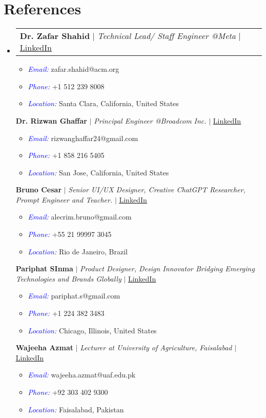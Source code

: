 \documentclass[letterpaper,11pt]{article}
\makeatletter
\newcommand{\resumeItem}[1]{
  \item\small{
    {#1 \vspace{-2pt}}
  }
}
\newcommand{\resumeProjectHeading}[2]{
    \item
    \begin{tabular*}{0.97\textwidth}{l@{\extracolsep{\fill}}r}
      \small#1 & #2 \\
    \end{tabular*}\vspace{-7pt}
}
\newcommand{\resumeSubHeadingListStart}{\begin{itemize}[leftmargin=0.15in, label={}]}
\newcommand{\resumeSubHeadingListEnd}{\end{itemize}}
\newcommand{\resumeItemListStart}{\begin{itemize}}
\newcommand{\resumeItemListEnd}{\end{itemize}\vspace{-5pt}}
\makeatother
\begin{document}
\section{\textbf{References}}
\resumeSubHeadingListStart
\resumeProjectHeading
{\textbf{{Dr. Zafar Shahid}} $|$ \emph{Technical Lead/ Staff Engineer @Meta} $|$ {\href{https://www.linkedin.com/in/zafarshahid/}{\underline{LinkedIn}}}}{}
\resumeItemListStart
\resumeItem{\textcolor{blue}{\itshape Email:} zafar.shahid@acm.org}
\resumeItem{\textcolor{blue}{\itshape Phone:} +1 512 239 8008}
\resumeItem{\textcolor{blue}{\itshape Location:} Santa Clara, California, United States}
\resumeItemListEnd
{\textbf{{Dr. Rizwan Ghaffar}} $|$ \emph{Principal Engineer @Broadcom Inc.} $|$ {\href{https://www.linkedin.com/in/rizwan-ghaffar-8283231a/}{\underline{LinkedIn}}}}{}
\resumeItemListStart
\resumeItem{\textcolor{blue}{\itshape Email:} rizwanghaffar24@gmail.com}
\resumeItem{\textcolor{blue}{\itshape Phone:} +1 858 216 5405}
\resumeItem{\textcolor{blue}{\itshape Location:} San Jose, California, United States}
\resumeItemListEnd
{\textbf{{Bruno Cesar}} $|$ \emph{Senior UI/UX Designer, Creative ChatGPT Researcher, Prompt Engineer and Teacher.} $|$ {\href{https://www.linkedin.com/in/brunoalecrim/}{\underline{LinkedIn}}}}{}
\resumeItemListStart
\resumeItem{\textcolor{blue}{\itshape Email:} alecrim.bruno@gmail.com}
\resumeItem{\textcolor{blue}{\itshape Phone:} +55 21 99997 3045}
\resumeItem{\textcolor{blue}{\itshape Location:} Rio de Janeiro, Brazil}
\resumeItemListEnd
{\textbf{{Pariphat SInma}} $|$ \emph{Product Designer, Design Innovator Bridging Emerging Technologies and Brands Globally} $|$ {\href{https://www.linkedin.com/in/pariphat-sinma/}{\underline{LinkedIn}}}}{}
\resumeItemListStart
\resumeItem{\textcolor{blue}{\itshape Email:} pariphat.s@gmail.com}
\resumeItem{\textcolor{blue}{\itshape Phone:} +1 224 382 3483}
\resumeItem{\textcolor{blue}{\itshape Location:} Chicago, Illinois, United States}
\resumeItemListEnd
{\textbf{{Wajeeha Azmat}} $|$ \emph{Lecturer at University of Agriculture, Faisalabad} $|$ {\href{https://www.linkedin.com/in/wajeehaazmat/}{\underline{LinkedIn}}}}{}
\resumeItemListStart
\resumeItem{\textcolor{blue}{\itshape Email:} wajeeha.azmat@uaf.edu.pk}
\resumeItem{\textcolor{blue}{\itshape Phone:} +92 303 402 9300}
\resumeItem{\textcolor{blue}{\itshape Location:} Faisalabad, Pakistan}
\resumeItemListEnd
\resumeSubHeadingListEnd

%

\end{document}
